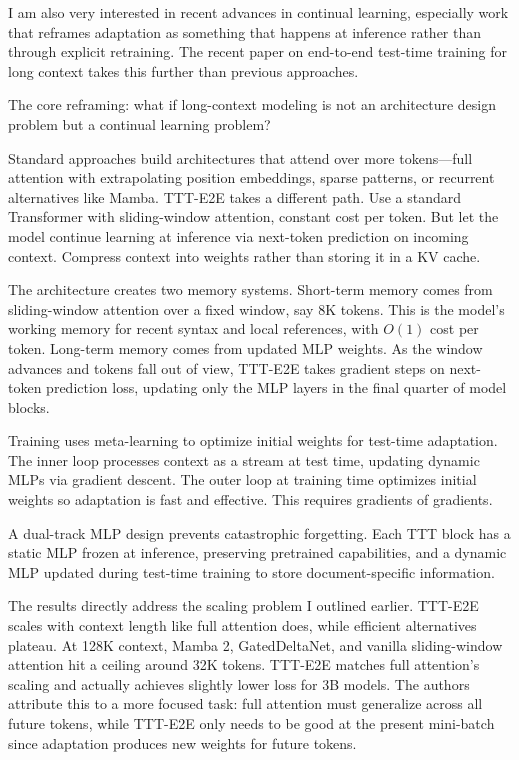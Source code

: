 \documentclass[12pt]{article}
\begin{document}
I am also very interested in recent advances in continual learning, especially work that reframes adaptation as something that happens at inference rather than through explicit retraining. The recent paper on end-to-end test-time training for long context takes this further than previous approaches.

The core reframing: what if long-context modeling is not an architecture design problem but a continual learning problem?

Standard approaches build architectures that attend over more tokens---full attention with extrapolating position embeddings, sparse patterns, or recurrent alternatives like Mamba. TTT-E2E takes a different path. Use a standard Transformer with sliding-window attention, constant cost per token. But let the model continue learning at inference via next-token prediction on incoming context. Compress context into weights rather than storing it in a KV cache.

The architecture creates two memory systems. Short-term memory comes from sliding-window attention over a fixed window, say 8K tokens. This is the model's working memory for recent syntax and local references, with $O(1)$ cost per token. Long-term memory comes from updated MLP weights. As the window advances and tokens fall out of view, TTT-E2E takes gradient steps on next-token prediction loss, updating only the MLP layers in the final quarter of model blocks.

Training uses meta-learning to optimize initial weights for test-time adaptation. The inner loop processes context as a stream at test time, updating dynamic MLPs via gradient descent. The outer loop at training time optimizes initial weights so adaptation is fast and effective. This requires gradients of gradients.

A dual-track MLP design prevents catastrophic forgetting. Each TTT block has a static MLP frozen at inference, preserving pretrained capabilities, and a dynamic MLP updated during test-time training to store document-specific information.

The results directly address the scaling problem I outlined earlier. TTT-E2E scales with context length like full attention does, while efficient alternatives plateau. At 128K context, Mamba 2, GatedDeltaNet, and vanilla sliding-window attention hit a ceiling around 32K tokens. TTT-E2E matches full attention's scaling and actually achieves slightly lower loss for 3B models. The authors attribute this to a more focused task: full attention must generalize across all future tokens, while TTT-E2E only needs to be good at the present mini-batch since adaptation produces new weights for future tokens.
\end{document}
